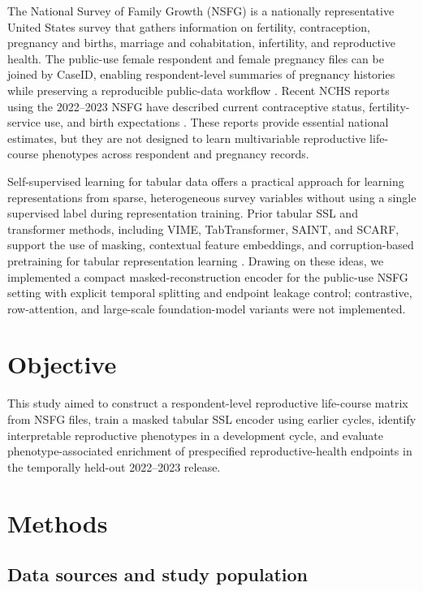 \documentclass[referee,pdflatex,sn-basic,Numbered]{sn-jnl}
\begin{document}
The National Survey of Family Growth (NSFG) is a nationally representative United States survey that gathers information on fertility, contraception, pregnancy and births, marriage and cohabitation, infertility, and reproductive health. The public-use female respondent and female pregnancy files can be joined by CaseID, enabling respondent-level summaries of pregnancy histories while preserving a reproducible public-data workflow \cite{cdc_nsfg_puf,cdc_nsfg_combined}. Recent NCHS reports using the 2022--2023 NSFG have described current contraceptive status, fertility-service use, and birth expectations \cite{cdc_db539,cdc_db542,cdc_db560}. These reports provide essential national estimates, but they are not designed to learn multivariable reproductive life-course phenotypes across respondent and pregnancy records.

Self-supervised learning for tabular data offers a practical approach for learning representations from sparse, heterogeneous survey variables without using a single supervised label during representation training. Prior tabular SSL and transformer methods, including VIME, TabTransformer, SAINT, and SCARF, support the use of masking, contextual feature embeddings, and corruption-based pretraining for tabular representation learning \cite{vime,tabtransformer,saint,scarf}. Drawing on these ideas, we implemented a compact masked-reconstruction encoder for the public-use NSFG setting with explicit temporal splitting and endpoint leakage control; contrastive, row-attention, and large-scale foundation-model variants were not implemented.

\section{Objective}

This study aimed to construct a respondent-level reproductive life-course matrix from NSFG files, train a masked tabular SSL encoder using earlier cycles, identify interpretable reproductive phenotypes in a development cycle, and evaluate phenotype-associated enrichment of prespecified reproductive-health endpoints in the temporally held-out 2022--2023 release.

\section{Methods}

\subsection{Data sources and study population}
\end{document}
